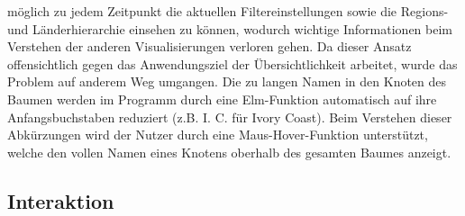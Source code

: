 \documentclass[usegeometry=true]{scrartcl}
\begin{document}
möglich zu jedem Zeitpunkt die aktuellen Filtereinstellungen sowie die Regions- und Länderhierarchie einsehen zu können, wodurch wichtige Informationen beim Verstehen der anderen Visualisierungen verloren gehen. Da dieser Ansatz offensichtlich gegen das Anwendungsziel der Übersichtlichkeit arbeitet, wurde das Problem auf anderem Weg umgangen. Die zu langen Namen in den Knoten des Baumen werden im Programm durch eine Elm-Funktion automatisch auf ihre Anfangsbuchstaben reduziert (z.B. \glqq I. C.\grqq{} für Ivory Coast). Beim Verstehen dieser Abkürzungen wird der Nutzer durch eine Maus-Hover-Funktion unterstützt, welche den vollen Namen eines Knotens oberhalb des gesamten Baumes anzeigt.\\

\subsection{Interaktion} \label{interaktion}
\end{document}
